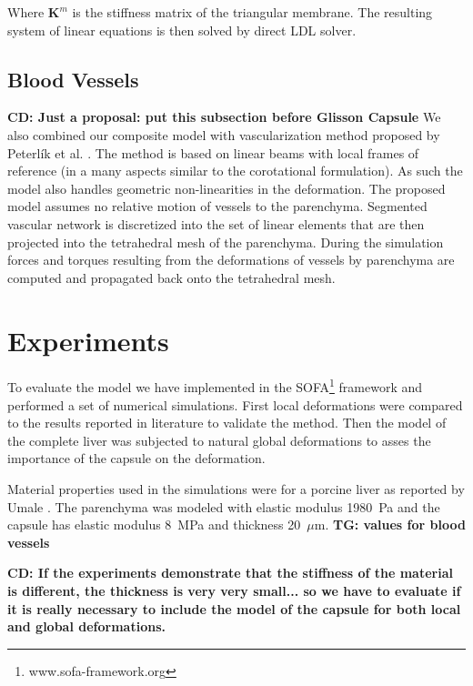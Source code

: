 \documentclass{llncs}
\newcommand{\TG}[1]{{\color{blue}\textbf{TG: #1}}}
\newcommand{\CD}[1]{{\color{green}\textbf{CD: #1}}}
\newcommand{\Mat}[1]{\mathbf{#1}}
\begin{document}
Where $\Mat{K}^m$ is the stiffness matrix of the triangular membrane.
The resulting
system of linear equations is then solved by direct LDL solver.


\subsection{Blood Vessels} %

\CD{Just a proposal: put this subsection before Glisson Capsule}
We also combined our composite model with vascularization method proposed
by Peterl\'{i}k et al. \cite{Peterlik2012}. The method is based on linear beams
with local frames of reference (in a many aspects similar to the
corotational formulation). As such the model also handles geometric
non-linearities in the deformation. The proposed model assumes no relative
motion of vessels to the parenchyma. Segmented vascular network is
discretized into the set of linear elements that are then projected into
the tetrahedral mesh of the parenchyma. During the simulation forces and
torques resulting from the deformations of vessels by parenchyma are
computed and propagated back onto the tetrahedral mesh.




\section{Experiments} %

To evaluate the model we have implemented in the
SOFA\footnote{www.sofa-framework.org} framework and performed a set of
numerical simulations. First local deformations were compared to the
results reported in literature to validate the method. Then the model of
the complete liver was subjected to natural global deformations to asses
the importance of the capsule on the deformation.

Material properties used in the simulations were for a porcine liver as
reported by Umale \cite{Umale2013}. The
parenchyma was modeled with elastic modulus 1980~Pa and the capsule has
elastic modulus 8~MPa and thickness 20~$\mu$m.
\TG{values for blood vessels}


\CD{If the experiments demonstrate that the stiffness of the material is different, the thickness is very very small... so we have to evaluate if it is really necessary to include the model of the capsule for both local and global deformations.}
\end{document}

